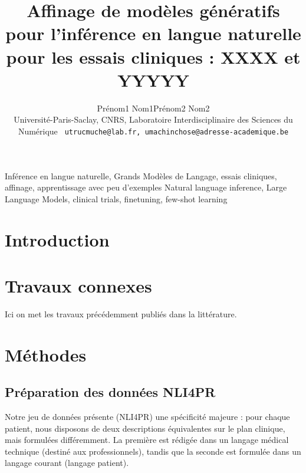 \documentclass[10pt,twoside]{article}
\title{Affinage de modèles génératifs pour l'inférence en langue naturelle pour les essais cliniques : XXXX et YYYYY}
\author{Prénom1 Nom1\up{1, 2}\quad Prénom2 Nom2\up{1, 3}\\
  {\small
    Université-Paris-Saclay, CNRS, Laboratoire Interdisciplinaire des Sciences du Numérique
    \texttt{
      utrucmuche@lab.fr, umachinchose@adresse-academique.be \\ 
}}}
\begin{document}
\maketitle



\motsClefs
  {Inférence en langue naturelle, Grands Modèles de Langage, essais cliniques, affinage, apprentissage avec peu d'exemples}
  {Natural language inference, Large Language Models, clinical trials, finetuning, few-shot learning}



\section{Introduction}





\section{Travaux connexes}

Ici on met les travaux précédemment publiés dans la littérature. 




\section{Méthodes}

\subsection{Préparation des données NLI4PR}
Notre jeu de données présente (NLI4PR) une spécificité majeure : pour chaque patient, nous disposons de deux descriptions équivalentes sur le plan clinique, mais formulées différemment. La première est rédigée dans un langage médical technique (destiné aux professionnels), tandis que la seconde est formulée dans un langage courant (langage patient). 
\end{document}

